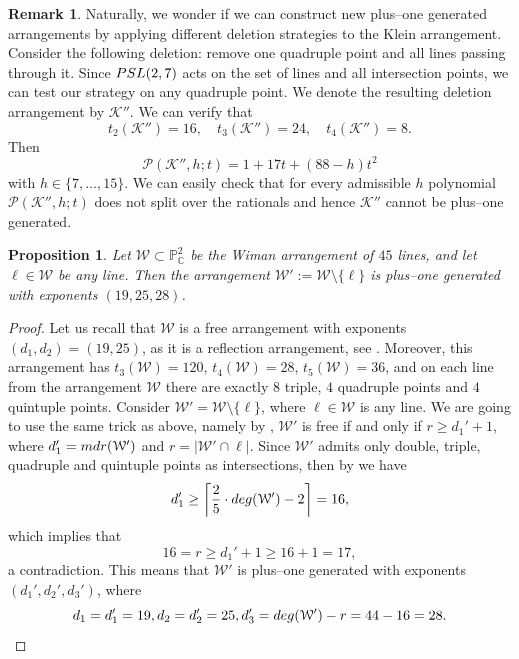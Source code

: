 \documentclass[12pt]{article}
\theoremstyle{plain}
\newtheorem{proposition}[thm]{Proposition}
\theoremstyle{definition}
\newtheorem{remark}[thm]{Remark}
\begin{document}
\begin{remark}
Naturally, we wonder if we can construct new plus--one generated arrangements by applying different deletion strategies to the Klein arrangement. Consider the following deletion: remove one quadruple point and all lines passing through it. Since ${\rm PSL}(2,7)$ acts on the set of lines and all intersection points, we can test our strategy on any quadruple point. We denote the resulting deletion arrangement by $\mathcal{K}''$. We can verify that
$$t_{2}(\mathcal{K}'') = 16, \quad t_{3}(\mathcal{K}'') = 24, \quad t_{4}(\mathcal{K}'')=8.$$
Then
$$\mathcal{P}(\mathcal{K}'',h;t) = 1 + 17t + (88-h)t^{2}$$
with $h \in \{7, \ldots, 15\}$. We can easily check that for every admissible $h$ polynomial $\mathcal{P}(\mathcal{K}'',h;t)$ does not split over the rationals and hence $\mathcal{K}''$ cannot be plus--one generated.
\end{remark}
\begin{proposition}
Let $\mathcal{W} \subset \mathbb{P}^{2}_{\mathbb{C}}$ be the Wiman arrangement of $45$ lines, and let $\ell \in \mathcal{W}$ be any line. Then the arrangement $\mathcal{W}' := \mathcal{W} \setminus \{\ell\}$ is plus--one generated with exponents $(19,25,28)$.
\end{proposition}
\begin{proof}
Let us recall that $\mathcal{W}$ is a free arrangement with exponents $(d_{1},d_{2}) = (19,25)$, as it is a reflection arrangement, see \cite[Chapter 6]{OT92}. Moreover, this arrangement has $t_{3}(\mathcal{W})=120$, $t_{4}(\mathcal{W})=28$, $t_{5}(\mathcal{W})=36$, and on each line from the arrangement $\mathcal{W}$ there are exactly $8$ triple, $4$ quadruple points and $4$ quintuple points. Consider $\mathcal{W}' = \mathcal{W} \setminus \{\ell\}$, where $\ell \in \mathcal{W}$ is any line. We are going to use the same trick as above, namely by \cite[Theorem 1.3 (3)]{POG}, $\mathcal{W}'$ is free if and only if $r \geq d_{1}' + 1$, where $d_{1}' = {\rm mdr}(\mathcal{W}')$ and $r = |\mathcal{W}' \cap \ell|$.
Since $\mathcal{W}'$ admits only double, triple, quadruple and quintuple points as intersections, then by \cite[Theorem 2.1]{Dimca1} we have
$$d_{1}' \geq \bigg\lceil\frac{2}{5}\cdot {\rm deg}(\mathcal{W}')-2 \bigg\rceil = 16,$$
which implies that
$$16 = r \geq d_{1}' + 1 \geq 16 +1 = 17,$$
a contradiction. This means that $\mathcal{W}'$ is plus--one generated with exponents $(d_{1}',d_{2}',d_{3}')$, where
$$d_{1} =d_{1}'=19, d_{2} = d_{2}'=25, d_{3}' = {\rm deg}(\mathcal{W}')-r = 44 - 16 = 28.$$
\end{proof}
\end{document}
